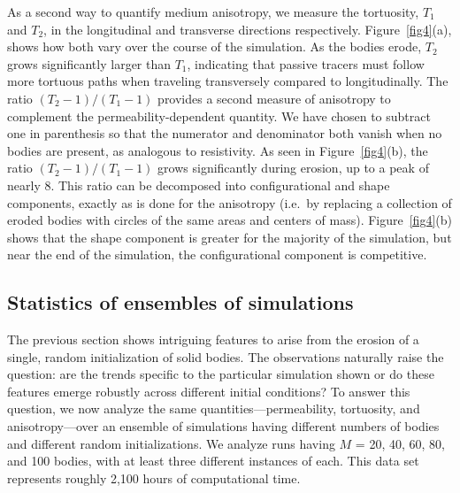 \documentclass[3p]{elsarticle}
\begin{document}
As a second way to quantify medium anisotropy, we measure the tortuosity, $T_1$ and $T_2$, in the longitudinal and transverse directions respectively. Figure~\ref{fig4}(a), shows how both vary over the course of the simulation. As the bodies erode, $T_2$ grows significantly larger than $T_1$, indicating that passive tracers must
follow more tortuous paths when traveling transversely compared to longitudinally. The ratio $(T_2-1)/(T_1-1)$ provides a second measure of anisotropy to complement the permeability-dependent quantity. We have chosen to subtract one in parenthesis so that the numerator and denominator both vanish when no bodies are present, as analogous to resistivity. As seen in Figure~\ref{fig4}(b), the ratio $(T_2-1)/(T_1-1)$ grows significantly during erosion, up to a peak of nearly 8. This ratio can be decomposed into configurational and shape components, exactly as is done for the anisotropy (i.e.~by replacing a collection of eroded bodies with circles of the same areas and centers of mass). Figure~\ref{fig4}(b) shows that the shape component is greater for the majority of the simulation, but near the end of the simulation, the configurational component is competitive. 


\subsection{Statistics of ensembles of simulations}
\label{sec:stat_sims}

The previous section shows intriguing features to arise from the erosion of a single, random initialization of solid bodies. The observations naturally raise the question: are the trends specific to the particular simulation shown or do these features emerge robustly across different initial conditions? To answer this question, we now analyze the same quantities---permeability, tortuosity, and anisotropy---over an ensemble of simulations having different numbers of bodies and different random initializations. We analyze runs having $M$ = 20, 40, 60, 80, and 100 bodies, with at least three different instances of each. This data set represents roughly 2,100 hours of computational time.  
\end{document}
